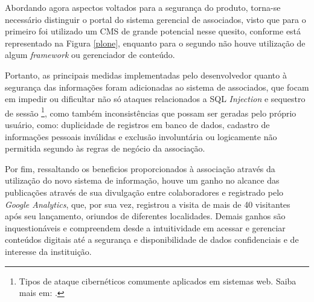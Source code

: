 Abordando agora aspectos voltados para a segurança do produto, torna-se necessário distinguir o portal do sistema gerencial de associados, visto que para o primeiro foi utilizado um CMS de grande potencial nesse quesito, conforme está representado na Figura \ref{plone}, enquanto para o segundo não houve utilização de algum \textit{framework} ou gerenciador de conteúdo. 

Portanto, as principais medidas implementadas pelo desenvolvedor quanto à segurança das informações foram adicionadas ao sistema de associados, que focam em impedir ou dificultar não só ataques relacionados a SQL \textit{Injection} e sequestro de sessão \footnote{Tipos de ataque cibernéticos comumente aplicados em sistemas web. Saiba mais em: .}, como também inconsistências que possam ser geradas pelo próprio usuário, como: duplicidade de registros em banco de dados, cadastro de informações pessoais inválidas e exclusão involuntária ou logicamente não permitida segundo às regras de negócio da associação.

Por fim, ressaltando os beneficios proporcionados à associação através da utilização do novo sistema de informação, houve um ganho no alcance das publicações através de sua divulgação entre colaboradores e registrado pelo \textit{Google Analytics}, que, por sua vez, registrou a visita de mais de 40 visitantes após seu lançamento, oriundos de diferentes localidades. Demais ganhos são inquestionáveis e compreendem desde a intuitividade em acessar e gerenciar conteúdos digitais até a segurança e disponibilidade de dados confidenciais e de interesse da instituição.  

